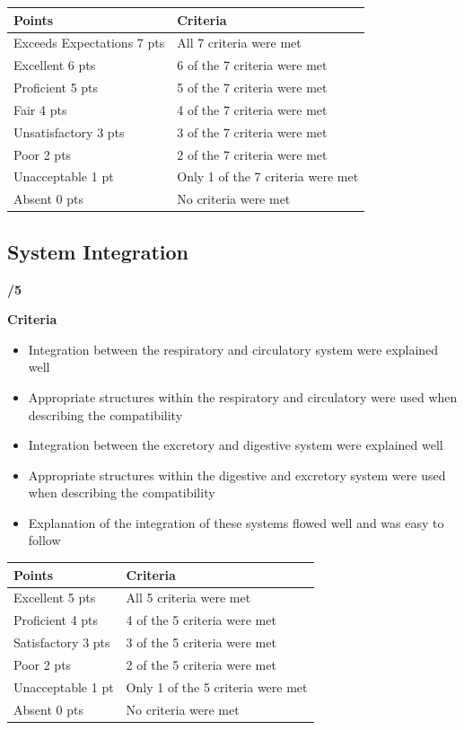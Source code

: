 \documentclass[
]{book}
\providecommand{\tightlist}{%
  \setlength{\itemsep}{0pt}\setlength{\parskip}{0pt}}
\begin{document}
\begin{longtable}[]{@{}ll@{}}
\toprule
Points & Criteria \\
\midrule
\endhead
Exceeds Expectations 7 pts & All 7 criteria were met \\
Excellent 6 pts & 6 of the 7 criteria were met \\
Proficient 5 pts & 5 of the 7 criteria were met \\
Fair 4 pts & 4 of the 7 criteria were met \\
Unsatisfactory 3 pts & 3 of the 7 criteria were met \\
Poor 2 pts & 2 of the 7 criteria were met \\
Unacceptable 1 pt & Only 1 of the 7 criteria were met \\
Absent 0 pts & No criteria were met \\
\bottomrule
\end{longtable}

\hypertarget{system-integration}{%
\subsection*{System Integration}\label{system-integration}}

\textbf{/5}

\textbf{Criteria}

\begin{itemize}
\tightlist
\item
  Integration between the respiratory and circulatory system were explained well
\item
  Appropriate structures within the respiratory and circulatory were used when describing the compatibility
\item
  Integration between the excretory and digestive system were explained well
\item
  Appropriate structures within the digestive and excretory system were used when describing the compatibility
\item
  Explanation of the integration of these systems flowed well and was easy to follow
\end{itemize}

\begin{longtable}[]{@{}ll@{}}
\toprule
Points & Criteria \\
\midrule
\endhead
Excellent 5 pts & All 5 criteria were met \\
Proficient 4 pts & 4 of the 5 criteria were met \\
Satisfactory 3 pts & 3 of the 5 criteria were met \\
Poor 2 pts & 2 of the 5 criteria were met \\
Unacceptable 1 pt & Only 1 of the 5 criteria were met \\
Absent 0 pts & No criteria were met \\
\bottomrule
\end{longtable}
\end{document}
